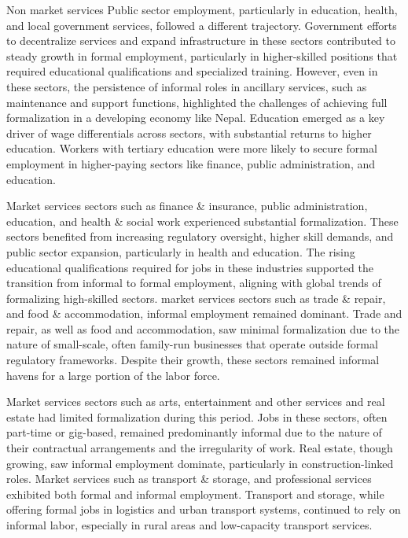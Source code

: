 Non market services Public sector employment, particularly in education, health, and local government services, followed a different trajectory. Government efforts to decentralize services and expand infrastructure in these sectors contributed to steady growth in formal employment, particularly in higher-skilled positions that required educational qualifications and specialized training. However, even in these sectors, the persistence of informal roles in ancillary services, such as maintenance and support functions, highlighted the challenges of achieving full formalization in a developing economy like Nepal. Education emerged as a key driver of wage differentials across sectors, with substantial returns to higher education. Workers with tertiary education were more likely to secure formal employment in higher-paying sectors like finance, public administration, and education. 

Market services sectors such as finance \& insurance, public administration, education, and health \& social work experienced substantial formalization. These sectors benefited from increasing regulatory oversight, higher skill demands, and public sector expansion, particularly in health and education. The rising educational qualifications required for jobs in these industries supported the transition from informal to formal employment, aligning with global trends of formalizing high-skilled sectors. market services sectors such as trade \& repair, and food \& accommodation, informal employment remained dominant. Trade and repair, as well as food and accommodation, saw minimal formalization due to the nature of small-scale, often family-run businesses that operate outside formal regulatory frameworks. Despite their growth, these sectors remained informal havens for a large portion of the labor force.

Market services sectors such as arts, entertainment and other services and real estate had limited formalization during this period. Jobs in these sectors, often part-time or gig-based, remained predominantly informal due to the nature of their contractual arrangements and the irregularity of work. Real estate, though growing, saw informal employment dominate, particularly in construction-linked roles. Market services such as transport \& storage, and professional services exhibited both formal and informal employment. Transport and storage, while offering formal jobs in logistics and urban transport systems, continued to rely on informal labor, especially in rural areas and low-capacity transport services.


